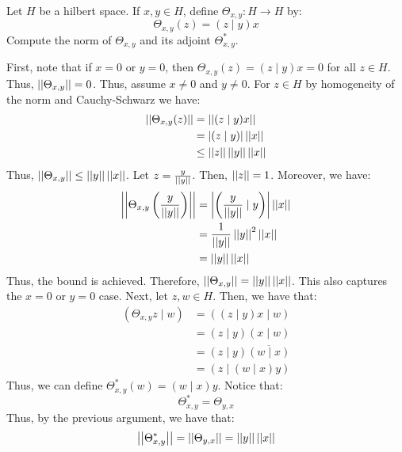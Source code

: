 \documentclass[12pt]{article}
\begin{document}
\begin{problem}{61}
    Let $H$ be a hilbert space. If $x, y \in H$, define $\Theta_{x,y}: H \to H$ by:
    \[ \Theta_{x,y}(z) = (z \mid y)x\]
    Compute the norm of $\Theta_{x,y}$ and its adjoint $\Theta_{x,y}^*$.
\end{problem}
\begin{solution}
    First, note that if $x = 0$ or $y = 0$, then $\Theta_{x,y}(z) = (z\mid y)x = 0$ for all $z \in H$. Thus, $\norm{\Theta_{x,y}} = 0$. Thus, assume $x \ne 0$ and $y \ne 0$.
    For $z \in H$ by homogeneity of the norm and Cauchy-Schwarz we have:
    \begin{align*}
        \norm{\Theta_{x,y}(z)} &= \norm{(z \mid y)x} \\
        &= |(z \mid y)| \norm{x} \\
        &\leq \norm{z} \norm{y} \norm{x}
    \end{align*}
    Thus, $\norm{\Theta_{x,y}} \leq \norm{y} \norm{x}$. Let $z = \frac{y}{\norm{y}}$. Then, $\norm{z} = 1$. Moreover, we have:
    \begin{align*}
        \norm{\Theta_{x,y}\left(\frac{y}{\norm{y}}\right)} &= \left|\left(\frac{y}{\norm{y}} \mid y\right)\right| \norm{x} \\
        &= \frac{1}{\norm{y}}\norm{y}^2 \norm{x} \\
        &= \norm{y}\norm{x}
    \end{align*}
    Thus, the bound is achieved. Therefore, $\norm{\Theta_{x,y}} = \norm{y}\norm{x}$. This also captures the $x = 0$ or $y=0$ case. \bbni
    Next, let $z, w \in H$. Then, we have that: 
    \begin{align*}
        (\Theta_{x,y} z \mid w) &= ((z \mid y)x \mid w) \\
        &= (z \mid y)(x \mid w) \\
        &= (z \mid y) \overline{(w \mid x)} \\
        &= (z \mid (w \mid x)y)
    \end{align*}
    Thus, we can define $\Theta_{x,y}^*(w) = (w \mid x)y$. Notice that:
    \[ \Theta^*_{x,y} = \Theta_{y,x} \]
    Thus, by the previous argument, we have that: 
    \[ \norm{\Theta_{x,y}^*} = \norm{\Theta_{y,x}} = \norm{y}\norm{x} \]
    
\end{solution}
\newpage
\end{document}
